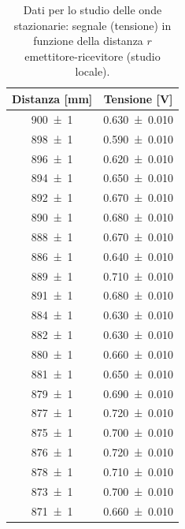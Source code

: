 \documentclass[a4paper]{article}
\begin{document}
\begin{table}[htbp]
\centering
\caption{Dati per lo studio delle onde stazionarie: segnale (tensione) in funzione della distanza $r$ emettitore-ricevitore (studio locale).}
\label{tab:dati_ampgeom_ondestazionarie}
\begin{tabular}{|c|c|}
\hline
Distanza [\si{\milli\metre}] & Tensione [\si{\volt}] \\\hline\hline
\num{900 \pm 1} & \num{0.630 \pm 0.010} \\
\num{898 \pm 1} & \num{0.590 \pm 0.010} \\
\num{896 \pm 1} & \num{0.620 \pm 0.010} \\
\num{894 \pm 1} & \num{0.650 \pm 0.010} \\
\num{892 \pm 1} & \num{0.670 \pm 0.010} \\
\num{890 \pm 1} & \num{0.680 \pm 0.010} \\
\num{888 \pm 1} & \num{0.670 \pm 0.010} \\
\num{886 \pm 1} & \num{0.640 \pm 0.010} \\
\num{889 \pm 1} & \num{0.710 \pm 0.010} \\
\num{891 \pm 1} & \num{0.680 \pm 0.010} \\
\num{884 \pm 1} & \num{0.630 \pm 0.010} \\
\num{882 \pm 1} & \num{0.630 \pm 0.010} \\
\num{880 \pm 1} & \num{0.660 \pm 0.010} \\
\num{881 \pm 1} & \num{0.650 \pm 0.010} \\
\num{879 \pm 1} & \num{0.690 \pm 0.010} \\
\num{877 \pm 1} & \num{0.720 \pm 0.010} \\
\num{875 \pm 1} & \num{0.700 \pm 0.010} \\
\num{876 \pm 1} & \num{0.720 \pm 0.010} \\
\num{878 \pm 1} & \num{0.710 \pm 0.010} \\
\num{873 \pm 1} & \num{0.700 \pm 0.010} \\
\num{871 \pm 1} & \num{0.660 \pm 0.010} \\
\hline
\end{tabular}
\end{table}
\end{document}
